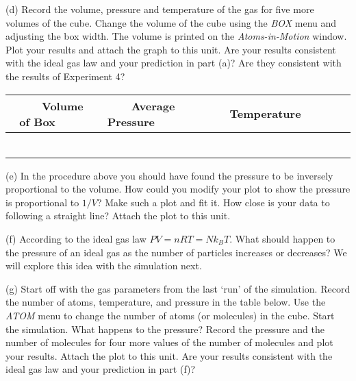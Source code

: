 (d) Record the volume, pressure and temperature of the gas for five more volumes of the cube. Change the volume of the cube using the
{\it BOX} menu and adjusting the box width. The volume is printed on the
{\it Atoms-in-Motion} window.
Plot your results and attach the graph
to this unit. Are your results consistent with the ideal gas law and
your prediction in part (a)? Are they consistent with the results of Experiment 4?

\vspace{0.3cm}
{\centering \begin{tabular}{|c|c|c|}
\hline 
~~~~{}Volume of Box~~~~&
~~~~Average Pressure~~~&
~~~~~~Temperature~~~~~~~\\
\hline
\hline 
& &
\\
\hline 
& &
\\
\hline 
& &
\\
\hline 
& &
\\
\hline 
& &
\\
\hline 
& &
\\
\hline
\end{tabular}\par}
\vspace{0.3cm}

(e) In the procedure above you should have found the pressure to be inversely
proportional to the volume. How could you modify your plot to show
the pressure is proportional to \( 1/V \)? Make such a plot and fit it.
How close is your data to following a straight line? Attach the plot
to this unit.
\vspace{1.5in}

(f) According to the ideal gas law \( PV = nRT = Nk_{B}T \). What
should happen to the pressure of an ideal gas as the number of particles
increases or decreases?
We will explore this idea with the simulation next.
\vspace{1.5in}

(g) Start off with the gas parameters from the last `run' of the 
simulation.
Record the number of atoms, temperature, and pressure in the table below.
Use the {\it ATOM} menu to change the number of atoms (or molecules) in the cube.
Start
the simulation. What happens to the pressure? Record the pressure
and the number of molecules for four more values of the number of
molecules and plot your results. Attach the plot to this unit. Are your results consistent with
the ideal gas law and your prediction in part (f)?
\vspace{1.5in}

